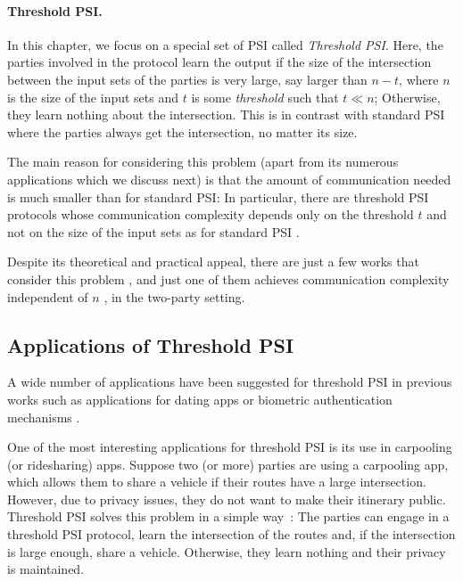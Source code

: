 \paragraph{Threshold PSI.}
 
 In this chapter, we focus on a special set of PSI called \emph{Threshold PSI}. Here, the parties involved in the protocol learn the output if the size of the intersection between the input sets of the parties is very large, say larger than $n-t$, where $n$ is the size of the input sets and $t$ is some \emph{threshold} such that $t\ll n$; Otherwise, they learn nothing about the intersection. This is in contrast with standard PSI where the parties always get the intersection, no matter its size.
 
 The main reason for considering this problem (apart from its numerous applications which we discuss next) is that the amount of communication needed is much smaller than for standard PSI: In particular, there are threshold PSI protocols whose communication complexity depends only on the threshold $t$ and not on the size of the input sets as for standard PSI \cite{C:GhoSim19}.
 
 Despite its theoretical and practical appeal, there are just a few works that consider this problem \cite{CSF:HalOrlSab17,EC:GhoNil19,C:GhoSim19}, and just one of them achieves communication complexity independent of $n$ \cite{C:GhoSim19}, in the two-party setting.
 
 
\subsection{Applications of Threshold PSI}

A wide number of applications have been suggested for threshold PSI in previous works such as applications for dating apps or biometric authentication mechanisms \cite{C:GhoSim19}. 

One of the most interesting applications for threshold PSI is its use in carpooling (or ridesharing) apps. Suppose two (or more) parties are using a carpooling app, which allows them to share a vehicle if their routes have a large intersection. However, due to privacy issues, they do not want to make their itinerary public. Threshold PSI solves this problem in a simple way~\cite{CSF:HalOrlSab17}: The parties can engage in a threshold PSI protocol, learn the intersection of the routes and, if the intersection is large enough, share a vehicle. Otherwise, they learn nothing and their privacy is maintained.
 
